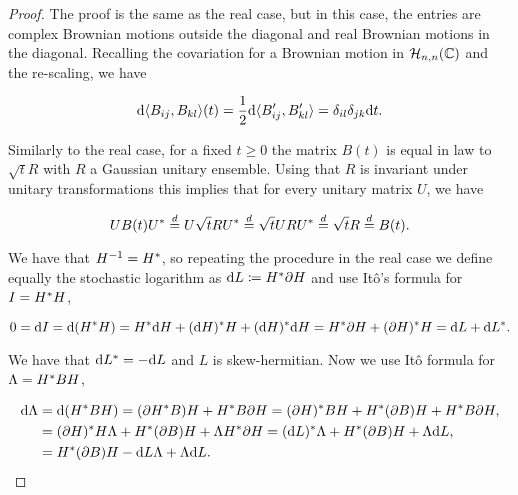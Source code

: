 \begin{proof}
    The proof is the same as the real case, but in this case, the entries are complex Brownian motions outside the diagonal and real Brownian motions in the diagonal. Recalling the covariation for a Brownian motion in $\mathcal H_{n,n}(\mathbb C)$ and the re-scaling, we have

    \begin{equation*}
        \mathrm d\langle B_{ij}, B_{kl}\rangle (t) = \frac12\mathrm d\langle B'_{ij}, B'_{kl}\rangle = \delta_{il}\delta_{jk}\mathrm d t.
    \end{equation*}
    
    
    Similarly to the real case, for a fixed $t\ge 0$ the matrix $B(t)$ is equal in law to $\sqrt tR$ with $R$ a Gaussian unitary ensemble. Using that $R$ is invariant under unitary transformations this implies that for every unitary matrix $U$, we have

    \begin{equation*}
        U B(t) U^* \overset{d}{=} U \sqrt{t} R U^* \overset{d}= \sqrt{t} U R U^* \overset{d}{=} \sqrt{t} R \overset{d}{=} B(t).
    \end{equation*}

    We have that $H^{-1} = H^*$, so repeating the procedure in the real case we define equally the stochastic logarithm as $\mathrm d L \coloneqq H^* \partial H$ and use Itô's formula for $I = H^*H$,

    \begin{equation*}
        0 = \mathrm d I = \mathrm d(H^* H) = H^* \mathrm d H + (\mathrm d H)^* H + (\mathrm d H)^* \mathrm d H = H^* \partial H + (\partial H)^* H = \mathrm d L + \mathrm d L^*.
    \end{equation*}

    We have that $\mathrm d L^* = - \mathrm d L$ and $L$ is skew-hermitian. Now we use Itô formula for $\Lambda = H^* B H$,

    \begin{align*}
        \mathrm d \Lambda &= \mathrm d (H^* B H) = (\partial H^* B)H + H^* B\partial H = (\partial H)^* B H + H^* (\partial B) H + H^* B \partial H, \\ 
        &= (\partial H)^* H \Lambda + H^* (\partial B) H + \Lambda H^* \partial H = (\mathrm d L)^* \Lambda + H^* (\partial B) H + \Lambda \mathrm d L, \\ 
        &= H^* (\partial B) H - \mathrm d L \Lambda + \Lambda \mathrm d L. 
    \end{align*}


\end{proof}
